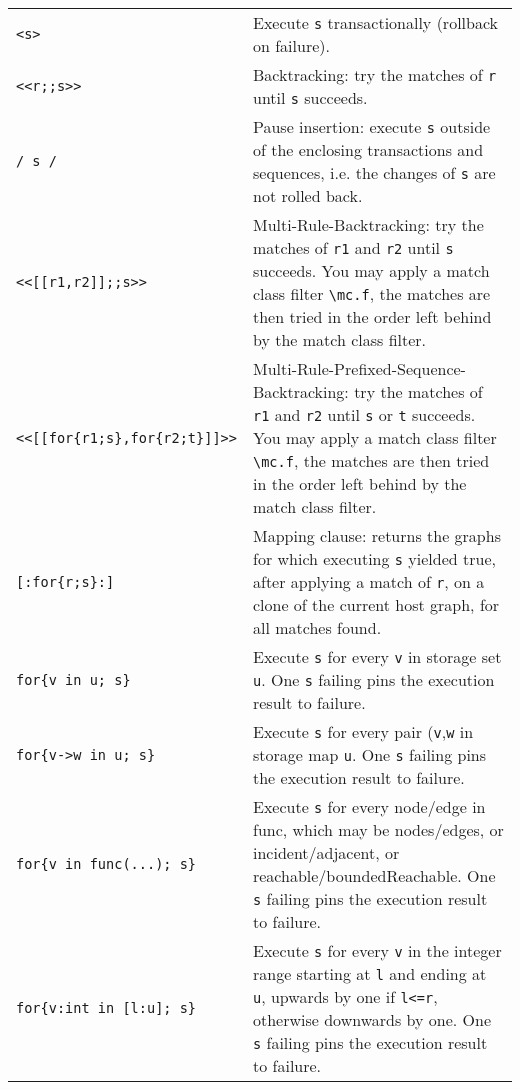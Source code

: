 \begin{table}[htbp]
\begin{minipage}{\linewidth} \renewcommand{\footnoterule}{} 
\begin{tabularx}{\linewidth}{|lX|}
\hline
\texttt{<s>} & Execute \texttt{s} transactionally (rollback on failure).\\
\texttt{<<r;;s>>} & Backtracking: try the matches of \texttt{r} until \texttt{s} succeeds.\\
\texttt{/ s /} & Pause insertion: execute \texttt{s} outside of the enclosing transactions and sequences, i.e. the changes of \texttt{s} are not rolled back.\\
\hline
\texttt{<<[[r1,r2]];;s>>} & Multi-Rule-Backtracking: try the matches of \texttt{r1} and \texttt{r2} until \texttt{s} succeeds. You may apply a match class filter \texttt{\textbackslash mc.f}, the matches are then tried in the order left behind by the match class filter.\\
\texttt{<<[[for\{r1;s\},for\{r2;t\}]]>>} & Multi-Rule-Prefixed-Sequence-Backtracking: try the matches of \texttt{r1} and \texttt{r2} until \texttt{s} or \texttt{t} succeeds. You may apply a match class filter \texttt{\textbackslash mc.f}, the matches are then tried in the order left behind by the match class filter.\\
\hline
\texttt{[:for\{r;s\}:]} & Mapping clause: returns the graphs for which executing \texttt{s} yielded true, after applying a match of \texttt{r}, on a clone of the current host graph, for all matches found.\\
\hline
\texttt{for\{v in u; s\}} & Execute \texttt{s} for every \texttt{v} in storage set \texttt{u}. One \texttt{s} failing pins the execution result to failure.\\
\texttt{for\{v->w in u; s\}} & Execute \texttt{s} for every pair (\texttt{v},\texttt{w} in storage map \texttt{u}. One \texttt{s} failing pins the execution result to failure.\\
\texttt{for\{v in func(...); s\}} & Execute \texttt{s} for every node/edge in func, which may be nodes/edges, or incident/adjacent, or reachable/boundedReachable. One \texttt{s} failing pins the execution result to failure.\\
\texttt{for\{v:int in [l:u]; s\}} & Execute \texttt{s} for every \texttt{v} in the integer range starting at \texttt{l} and ending at \texttt{u}, upwards by one if \texttt{l<=r}, otherwise downwards by one. One \texttt{s} failing pins the execution result to failure.\\

\end{tabularx}
\end{minipage}
\end{table}
